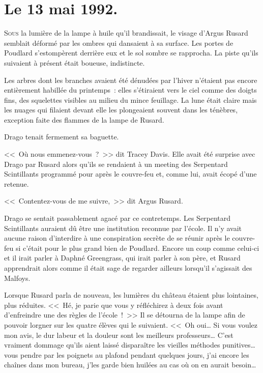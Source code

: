 
\section{Le 13 mai 1992.}

\lettrine{S}{ous} la lumière de la lampe à huile qu'il brandissait, le visage d'Argus Rusard semblait déformé par les ombres qui dansaient à sa surface. Les portes de Poudlard s'estompèrent derrière eux et le sol sombre se rapprocha. La piste qu'ils suivaient à présent était boueuse, indistincte.

Les arbres dont les branches avaient été dénudées par l'hiver n'étaient pas encore entièrement habillée du printemps~: elles s'étiraient vers le ciel comme des doigts fins, des squelettes visibles au milieu du mince feuillage. La lune était claire mais les nuages qui filaient devant elle les plongeaient souvent dans les ténèbres, exception faite des flammes de la lampe de Rusard.

Drago tenait fermement sa baguette.

<<~Où nous emmenez-vous~?~>> dit Tracey Davis. Elle avait été surprise avec Drago par Rusard alors qu'ils se rendaient à un meeting des Serpentard Scintillants programmé pour après le couvre-feu et, comme lui, avait écopé d'une retenue.

<<~Contentez-vous de me suivre,~>> dit Argus Rusard.

Drago se sentait passablement agacé par ce contretemps. Les Serpentard Scintillants auraient dû être une institution reconnue par l'école. Il n'y avait aucune raison d'interdire à une conspiration secrète de se réunir après le couvre-feu si c'était pour le plus grand bien de Poudlard. Encore un coup comme celui-ci et il irait parler à Daphné Greengrass, qui irait parler à son père, et Rusard apprendrait alors comme il était sage de regarder ailleurs lorsqu'il s'agissait des Malfoys.

Lorsque Rusard parla de nouveau, les lumières du château étaient plus lointaines, plus réduites. <<~Hé, je parie que vous y réfléchirez à deux fois avant d'enfreindre une des règles de l'école~!~>> Il se détourna de la lampe afin de pouvoir lorgner sur les quatre élèves qui le suivaient. <<~Oh oui… Si vous voulez mon avis, le dur labeur et la douleur sont les meilleurs professeurs… C'est vraiment dommage qu'ils aient laissé disparaître les vieilles méthodes punitives… vous pendre par les poignets au plafond pendant quelques jours, j'ai encore les chaînes dans mon bureau, j'les garde bien huilées au cas où on en aurait besoin…

